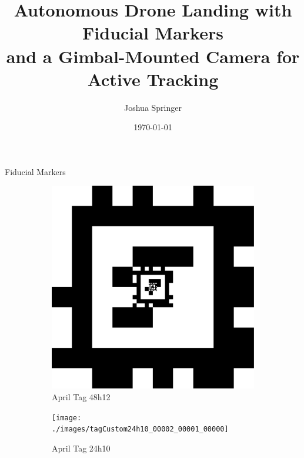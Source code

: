 \documentclass[aspectratio=169]{beamer}
\title{Autonomous Drone Landing with Fiducial Markers\\and a Gimbal-Mounted Camera for Active Tracking}
\author{Joshua Springer}
\institute{Reykjavik University\\Department of Computer Science}
\date{\specialdate\today}
\begin{document}
\maketitle

\begin{frame}{Fiducial Markers}
	\vspace*{\fill}
	\begin{figure}[]
	    \centering
	    \begin{subfigure}[b]{0.2\linewidth}
		\includegraphics[width=\textwidth]{./images/tagCustom48h12_00002_00001_00000}
		\caption{April Tag 48h12}
		\label{figure:apriltag48h12}
	    \end{subfigure}
		\hspace{0.05\linewidth}
	    \begin{subfigure}[b]{0.2\linewidth}
		\texttt{[image: ./images/tagCustom24h10\_00002\_00001\_00000]}
		\caption{April Tag 24h10}
		\label{figure:apriltag24h10}
	    \end{subfigure}
		\hspace{0.05\linewidth}
	    \begin{subfigure}[b]{0.2\linewidth}

\end{subfigure}
\end{figure}
\end{frame}
\end{document}

